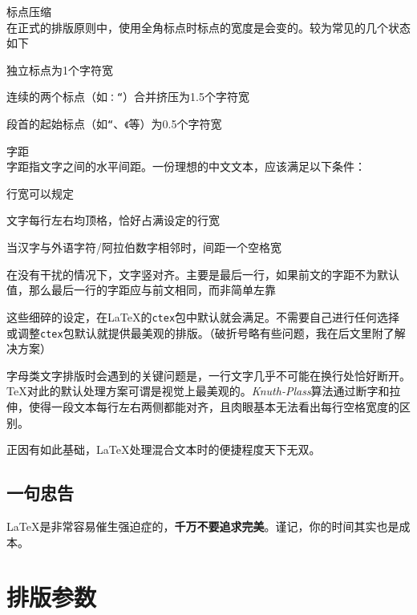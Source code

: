 \documentclass[10pt,openany]{book}
\begin{document}
\begin{sloppypar}
    \begin{tightitem}
        \item 标点压缩\\在正式的排版原则中，使用全角标点时标点的宽度是会变的。较为常见的几个状态如下
        \begin{tightenum}
            \item 独立标点为1个字符宽
            \item 连续的两个标点（如\texttt{：“}）合并挤压为1.5个字符宽
            \item 段首的起始标点（如\texttt{“}、\texttt{《}等）为0.5个字符宽
        \end{tightenum}
        \item 字距\\字距指文字之间的水平间距。一份理想的中文文本，应该满足以下条件：
        \begin{tightenum}
            \item 行宽可以规定
            \item 文字每行左右均顶格，恰好占满设定的行宽
            \item 当汉字与外语字符/阿拉伯数字相邻时，间距一个空格宽
            \item 在没有干扰的情况下，文字竖对齐。主要是最后一行，如果前文的字距不为默认值，那么最后一行的字距应与前文相同，而非简单左靠
        \end{tightenum}
    \end{tightitem}

    这些细碎的设定，在{\LaTeX}的\texttt{ctex}包中默认就会满足。不需要自己进行任何选择或调整\texttt{ctex}包默认就提供最美观的排版。（破折号略有些问题，我在后文里附了解决方案）

    字母类文字排版时会遇到的关键问题是，一行文字几乎不可能在换行处恰好断开。{\TeX}对此的默认处理方案可谓是视觉上最美观的。\emph{Knuth-Plass}算法通过断字和拉伸，使得一段文本每行左右两侧都能对齐，且肉眼基本无法看出每行空格宽度的区别。

    正因有如此基础，{\LaTeX}处理混合文本时的便捷程度天下无双。

    \section{一句忠告}

     {\LaTeX}是非常容易催生强迫症的，\textbf{千万不要追求完美}。谨记，你的时间其实也是成本。

    \chapter{排版参数}


\end{sloppypar}
\end{document}
